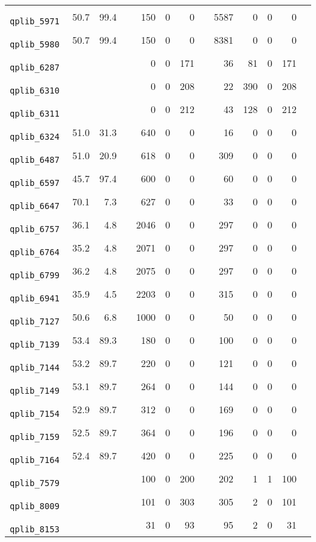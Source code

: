 {\begin{longtable}{lrrrrrrrrrrrr}
\texttt{ 	qplib\_5971	}	&	50.7	&	99.4	&	&	150	&	0	&	0	&	&	5587	&	0	&	0	&	0	\\
\texttt{ 	qplib\_5980	}	&	50.7	&	99.4	&	&	150	&	0	&	0	&	&	8381	&	0	&	0	&	0	\\
\texttt{ 	qplib\_6287	}	&		&		&	&	0	&	0	&	171	&	&	36	&	81	&	0	&	171	\\
\texttt{ 	qplib\_6310	}	&		&		&	&	0	&	0	&	208	&	&	22	&	390	&	0	&	208	\\
\texttt{ 	qplib\_6311	}	&		&		&	&	0	&	0	&	212	&	&	43	&	128	&	0	&	212	\\
\texttt{ 	qplib\_6324	}	&	51.0	&	31.3	&	&	640	&	0	&	0	&	&	16	&	0	&	0	&	0	\\
\texttt{ 	qplib\_6487	}	&	51.0	&	20.9	&	&	618	&	0	&	0	&	&	309	&	0	&	0	&	0	\\
\texttt{ 	qplib\_6597	}	&	45.7	&	97.4	&	&	600	&	0	&	0	&	&	60	&	0	&	0	&	0	\\
\texttt{ 	qplib\_6647	}	&	70.1	&	7.3	&	&	627	&	0	&	0	&	&	33	&	0	&	0	&	0	\\
\texttt{ 	qplib\_6757	}	&	36.1	&	4.8	&	&	2046	&	0	&	0	&	&	297	&	0	&	0	&	0	\\
\texttt{ 	qplib\_6764	}	&	35.2	&	4.8	&	&	2071	&	0	&	0	&	&	297	&	0	&	0	&	0	\\
\texttt{ 	qplib\_6799	}	&	36.2	&	4.8	&	&	2075	&	0	&	0	&	&	297	&	0	&	0	&	0	\\
\texttt{ 	qplib\_6941	}	&	35.9	&	4.5	&	&	2203	&	0	&	0	&	&	315	&	0	&	0	&	0	\\
\texttt{ 	qplib\_7127	}	&	50.6	&	6.8	&	&	1000	&	0	&	0	&	&	50	&	0	&	0	&	0	\\
\texttt{ 	qplib\_7139	}	&	53.4	&	89.3	&	&	180	&	0	&	0	&	&	100	&	0	&	0	&	0	\\
\texttt{ 	qplib\_7144	}	&	53.2	&	89.7	&	&	220	&	0	&	0	&	&	121	&	0	&	0	&	0	\\
\texttt{ 	qplib\_7149	}	&	53.1	&	89.7	&	&	264	&	0	&	0	&	&	144	&	0	&	0	&	0	\\
\texttt{ 	qplib\_7154	}	&	52.9	&	89.7	&	&	312	&	0	&	0	&	&	169	&	0	&	0	&	0	\\
\texttt{ 	qplib\_7159	}	&	52.5	&	89.7	&	&	364	&	0	&	0	&	&	196	&	0	&	0	&	0	\\
\texttt{ 	qplib\_7164	}	&	52.4	&	89.7	&	&	420	&	0	&	0	&	&	225	&	0	&	0	&	0	\\
\texttt{ 	qplib\_7579	}	&		&		&	&	100	&	0	&	200	&	&	202	&	1	&	1	&	100	\\
\texttt{ 	qplib\_8009	}	&		&		&	&	101	&	0	&	303	&	&	305	&	2	&	0	&	101	\\
\texttt{ 	qplib\_8153	}	&		&		&	&	31	&	0	&	93	&	&	95	&	2	&	0	&	31	\\

\end{longtable}}
